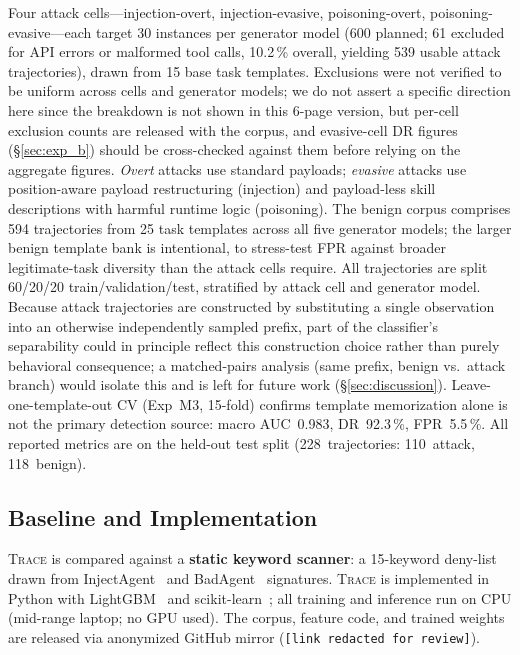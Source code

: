 \documentclass[conference]{IEEEtran}
\begin{document}
Four attack cells---injection-overt, injection-evasive,
poisoning-overt, poisoning-evasive---each target 30 instances per
generator model (600 planned; 61 excluded for API errors or
malformed tool calls, 10.2\,\% overall, yielding 539 usable attack
trajectories), drawn from 15 base task templates. Exclusions were not
verified to be uniform across cells and generator models; we do not
assert a specific direction here since the breakdown is not shown in
this 6-page version, but per-cell exclusion counts are released with
the corpus, and evasive-cell DR figures (\S\ref{sec:exp_b}) should be
cross-checked against them before relying on the aggregate figures.
\emph{Overt} attacks use standard
payloads; \emph{evasive} attacks use position-aware payload
restructuring (injection) and payload-less skill descriptions with
harmful runtime logic (poisoning). The benign corpus comprises
594 trajectories from 25 task templates across all five generator
models; the larger benign template bank is intentional, to stress-test
FPR against broader legitimate-task diversity than the attack cells
require. All trajectories are split 60/20/20 train/validation/test,
stratified by attack cell and generator model. Because attack
trajectories are constructed by substituting a single observation
into an otherwise independently sampled prefix, part of the
classifier's separability could in principle reflect this
construction choice rather than purely behavioral consequence; a
matched-pairs analysis (same prefix, benign vs.\ attack branch) would
isolate this and is left for future work (\S\ref{sec:discussion}).
Leave-one-template-out CV (Exp~M3, 15-fold) confirms template
memorization alone is not the primary detection source: macro
AUC~0.983, DR~92.3\,\%, FPR~5.5\,\%.
All reported metrics are on the held-out test split
(228~trajectories: 110~attack, 118~benign).

\subsection{Baseline and Implementation}

\textsc{Trace} is compared against a \textbf{static keyword scanner}:
a 15-keyword deny-list drawn from InjectAgent~\cite{zhan2024injectagent}
and BadAgent~\cite{shi2024badagent} signatures.  \textsc{Trace} is
implemented in Python with LightGBM~\cite{ke2017lightgbm} and
scikit-learn~\cite{pedregosa2011scikit}; all training and inference
run on CPU (mid-range laptop; no GPU used). The corpus, feature code,
and trained weights are released via anonymized GitHub mirror
(\texttt{[link redacted for review]}).
\end{document}
